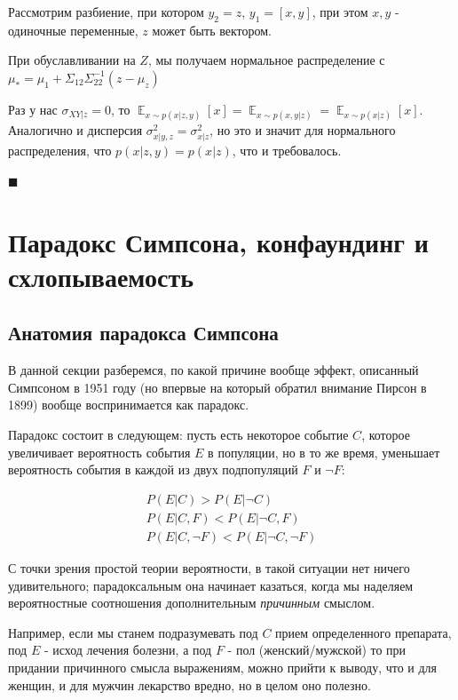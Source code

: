 \documentclass[fleqn]{article}
\DeclareMathOperator{\E}{\mathop\mathbb{E}}
\numberwithin{equation}{section}
\numberwithin{theorem}{section}
\numberwithin{figure}{section}
\numberwithin{lemma}{section}
\numberwithin{corollary}{section}
\begin{document}
Рассмотрим разбиение, при котором $y_2 = z$, $y_1 = [x,y]$, при этом $x,y$ - одиночные переменные, $z$ может быть вектором.

При обуславливании на $Z$, мы получаем нормальное распределение с $\mu_* = \mu_1 + \Sigma_{12}\Sigma_{22}^{-1}(z - \mu_z)$

Раз у нас $\sigma_{XY|z} = 0$, то $\E_{x \sim p(x|z,y)} [x] = \E_{x \sim p(x,y|z)} = \E_{x \sim p(x|z)} [x]$. Аналогично и дисперсия $\sigma^2_{x|y,z} = \sigma^2_{x|z}$, но это и значит для нормального распределения, что $p(x|z,y) = p(x|z)$, что и требовалось.

$\blacksquare$

\section{Парадокс Симпсона, конфаундинг и схлопываемость}

\subsection*{Анатомия парадокса Симпсона}

В данной секции разберемся, по какой причине вообще эффект, описанный Симпсоном в 1951 году (но впервые на который обратил внимание Пирсон в 1899) вообще воспринимается как парадокс. 

Парадокс состоит в следующем: пусть есть некоторое событие $C$, которое увеличивает вероятность события $E$ в популяции, но в то же время, уменьшает вероятность события в каждой из двух подпопуляций $F$ и $\neg F$:

\begin{align}
	P(E|C) > P(E|\neg C) \label{eq:simpson1} \\
	P(E|C,F) < P(E|\neg C, F) \label{eq:simpson2} \\
	P(E|C,\neg F) < P(E| \neg C, \neg F) \label{eq:simpson3}
\end{align}

С точки зрения простой теории вероятности, в такой ситуации нет ничего удивительного; парадоксальным она начинает казаться, когда мы наделяем вероятностные соотношения дополнительным \textit{причинным} смыслом.

Например, если мы станем подразумевать под $C$ прием определенного препарата, под $E$ - исход лечения болезни, а под $F$ - пол (женский/мужской) то при придании причинного смысла выражениям, можно прийти к выводу, что и для женщин, и для мужчин лекарство вредно, но в целом оно полезно. 
\end{document}
